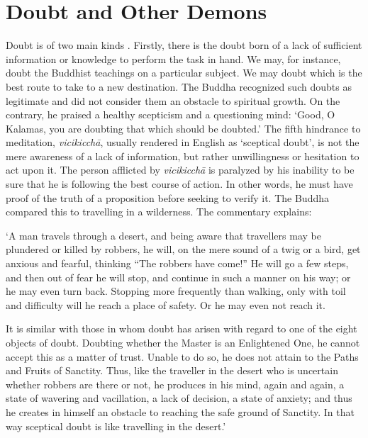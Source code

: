 

\chapter{Doubt and Other Demons}
\markright{\chapterAuthor}

Doubt is of two main kinds . Firstly, there is the doubt born of a lack
of sufficient information or knowledge to perform the task in hand. We
may, for instance, doubt the Buddhist teachings on a particular subject.
We may doubt which is the best route to take to a new destination. The
Buddha recognized such doubts as legitimate and did not consider them an
obstacle to spiritual growth. On the contrary, he praised a healthy
scepticism and a questioning mind: `Good, O Kalamas, you are doubting
that which should be doubted.' The fifth hindrance to meditation,
\emph{vicikicchā}, usually rendered in English as `sceptical doubt', is
not the mere awareness of a lack of information, but rather
unwillingness or hesitation to act upon it. The person afflicted by
\emph{vicikicchā} is paralyzed by his inability to be sure that he is
following the best course of action. In other words, he must have proof
of the truth of a proposition before seeking to verify it. The Buddha
compared this to travelling in a wilderness. The commentary explains:

`A man travels through a desert, and being aware that travellers may be
plundered or killed by robbers, he will, on the mere sound of a twig or
a bird, get anxious and fearful, thinking ``The robbers have come!'' He
will go a few steps, and then out of fear he will stop, and continue in
such a manner on his way; or he may even turn back. Stopping more
frequently than walking, only with toil and difficulty will he reach a
place of safety. Or he may even not reach it.

It is similar with those in whom doubt has arisen with regard to one of
the eight objects of doubt. Doubting whether the Master is an
Enlightened One, he cannot accept this as a matter of trust. Unable to
do so, he does not attain to the Paths and Fruits of Sanctity. Thus,
like the traveller in the desert who is uncertain whether robbers are
there or not, he produces in his mind, again and again, a state of
wavering and vacillation, a lack of decision, a state of anxiety; and
thus he creates in himself an obstacle to reaching the safe ground of
Sanctity. In that way sceptical doubt is like travelling in the desert.'

